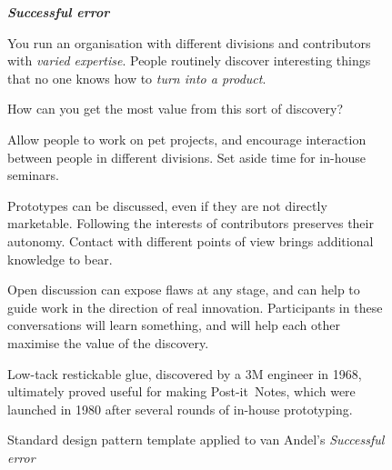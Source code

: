 \begin{figure}[!h]
{\normalsize
\begin{mdframed}
\vspace{2mm}
\textbf{\emph{Successful error}}~
\begin{description}[leftmargin=0\parindent,labelindent=0em,itemsep=2pt]
\item[{Context.}] You run an organisation with different
  divisions and contributors with {\sl varied expertise}.  People routinely
  discover interesting things that no one knows how to {\sl
    turn into a product}.
\item[{Problem.}]  How can you get the most value from this sort of discovery?
\item[{Solution.}] Allow people to work on pet projects, and encourage
  interaction between people in different divisions.  Set aside time
  for in-house seminars.
\item[{Rationale.}] Prototypes can be discussed, even if they are not
  directly marketable.  Following the interests of contributors
  preserves their autonomy.  Contact with different points of view
  brings additional knowledge to bear.
\item[{Resolution.}] 
Open discussion can
  expose flaws at any stage, and can help to guide work in the direction of
  real innovation.  Participants in these conversations
  will learn something, and will help each other maximise the value of
  the discovery.  
\item[{Example.}] Low-tack restickable glue, discovered by a 3M
  engineer in 1968, ultimately proved useful for making
  Post-it\texttrademark\ Notes, which were launched in 1980 after
  several rounds of in-house prototyping.
\end{description}
\vspace{-1mm}
\end{mdframed}
}
\caption{Standard design pattern template applied to van Andel's \em{Successful error}\label{fig:va-pattern-figure}}
\end{figure}


